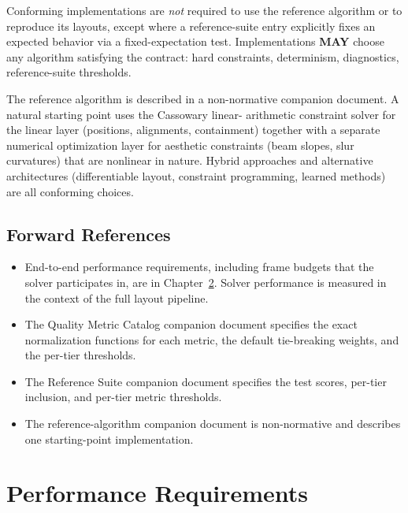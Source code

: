 \documentclass[11pt,letterpaper]{report}
\newcounter{requirement}[chapter]
\newcommand{\MAY}{\textbf{MAY}}
\begin{document}
\begin{requirement}
  \label{req:solver:algorithm-independence}
  Conforming implementations are \emph{not} required to use the
  reference algorithm or to reproduce its layouts, except where
  a reference-suite entry explicitly fixes an expected behavior
  via a fixed-expectation test. Implementations \MAY{} choose
  any algorithm satisfying the contract: hard constraints,
  determinism, diagnostics, reference-suite thresholds.
\end{requirement}

The reference algorithm is described in a non-normative companion
document. A natural starting point uses the Cassowary linear-
arithmetic constraint solver for the linear layer (positions,
alignments, containment) together with a separate numerical
optimization layer for aesthetic constraints (beam slopes, slur
curvatures) that are nonlinear in nature. Hybrid approaches and
alternative architectures (differentiable layout, constraint
programming, learned methods) are all conforming choices.

\section{Forward References}

\begin{itemize}
  \item End-to-end performance requirements, including frame budgets
    that the solver participates in, are in Chapter~\ref{ch:perf}.
    Solver performance is measured in the context of the full
    layout pipeline.
  \item The Quality Metric Catalog companion document specifies
    the exact normalization functions for each metric, the default
    tie-breaking weights, and the per-tier thresholds.
  \item The Reference Suite companion document specifies the
    test scores, per-tier inclusion, and per-tier metric
    thresholds.
  \item The reference-algorithm companion document is non-normative
    and describes one starting-point implementation.
\end{itemize}

\chapter{Performance Requirements}
\label{ch:perf}
\end{document}
